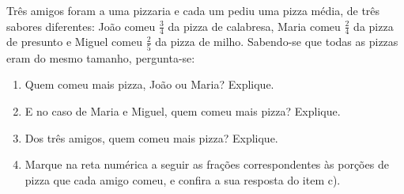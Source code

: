 \begin{atividade}{}\label{chap3-ativ8}

Três amigos foram a uma pizzaria e cada um pediu uma pizza média, de três sabores diferentes: João comeu $\frac{3}{4}$ da pizza de calabresa, Maria comeu  $\frac{2}{4}$ da pizza de presunto e Miguel comeu $\frac{2}{5}$ da pizza de milho. Sabendo-se que todas as pizzas eram do mesmo tamanho, pergunta-se:
\begin{enumerate} %
  \item     Quem comeu mais pizza, João ou Maria? Explique.
  \item     E no caso de Maria e Miguel, quem comeu mais pizza? Explique.
  \item     Dos três amigos, quem comeu mais pizza? Explique.
  \item     Marque na reta numérica a seguir as frações correspondentes às porções de pizza que cada amigo comeu, e confira a sua resposta do item c).
\end{enumerate} %

\begin{center}
\end{center}
\end{atividade}

